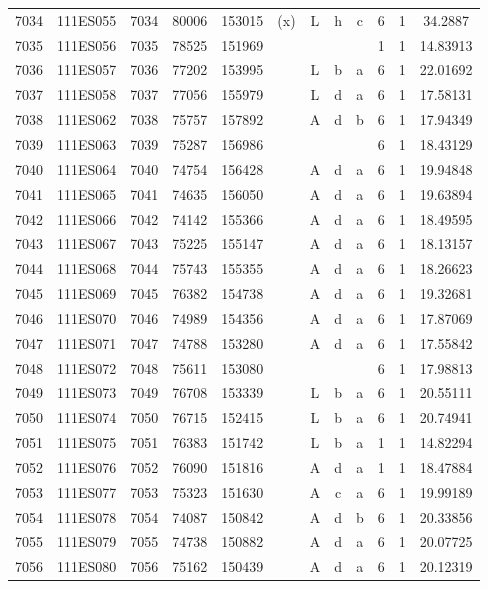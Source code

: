 \begin{tabular}{|*{12}{c|}}
7034 & 111ES055 & 7034 & 80006 & 153015 & (x) & L & h & c & 6 & 1 & 34.2887 \\ 
7035 & 111ES056 & 7035 & 78525 & 151969 &  &  &  &  & 1 & 1 & 14.83913 \\ 
7036 & 111ES057 & 7036 & 77202 & 153995 &  & L & b & a & 6 & 1 & 22.01692 \\ 
7037 & 111ES058 & 7037 & 77056 & 155979 &  & L & d & a & 6 & 1 & 17.58131 \\ 
7038 & 111ES062 & 7038 & 75757 & 157892 &  & A & d & b & 6 & 1 & 17.94349 \\ 
7039 & 111ES063 & 7039 & 75287 & 156986 &  &  &  &  & 6 & 1 & 18.43129 \\ 
7040 & 111ES064 & 7040 & 74754 & 156428 &  & A & d & a & 6 & 1 & 19.94848 \\ 
7041 & 111ES065 & 7041 & 74635 & 156050 &  & A & d & a & 6 & 1 & 19.63894 \\ 
7042 & 111ES066 & 7042 & 74142 & 155366 &  & A & d & a & 6 & 1 & 18.49595 \\ 
7043 & 111ES067 & 7043 & 75225 & 155147 &  & A & d & a & 6 & 1 & 18.13157 \\ 
7044 & 111ES068 & 7044 & 75743 & 155355 &  & A & d & a & 6 & 1 & 18.26623 \\ 
7045 & 111ES069 & 7045 & 76382 & 154738 &  & A & d & a & 6 & 1 & 19.32681 \\ 
7046 & 111ES070 & 7046 & 74989 & 154356 &  & A & d & a & 6 & 1 & 17.87069 \\ 
7047 & 111ES071 & 7047 & 74788 & 153280 &  & A & d & a & 6 & 1 & 17.55842 \\ 
7048 & 111ES072 & 7048 & 75611 & 153080 &  &  &  &  & 6 & 1 & 17.98813 \\ 
7049 & 111ES073 & 7049 & 76708 & 153339 &  & L & b & a & 6 & 1 & 20.55111 \\ 
7050 & 111ES074 & 7050 & 76715 & 152415 &  & L & b & a & 6 & 1 & 20.74941 \\ 
7051 & 111ES075 & 7051 & 76383 & 151742 &  & L & b & a & 1 & 1 & 14.82294 \\ 
7052 & 111ES076 & 7052 & 76090 & 151816 &  & A & d & a & 1 & 1 & 18.47884 \\ 
7053 & 111ES077 & 7053 & 75323 & 151630 &  & A & c & a & 6 & 1 & 19.99189 \\ 
7054 & 111ES078 & 7054 & 74087 & 150842 &  & A & d & b & 6 & 1 & 20.33856 \\ 
7055 & 111ES079 & 7055 & 74738 & 150882 &  & A & d & a & 6 & 1 & 20.07725 \\ 
7056 & 111ES080 & 7056 & 75162 & 150439 &  & A & d & a & 6 & 1 & 20.12319 \\ 

\end{tabular}
